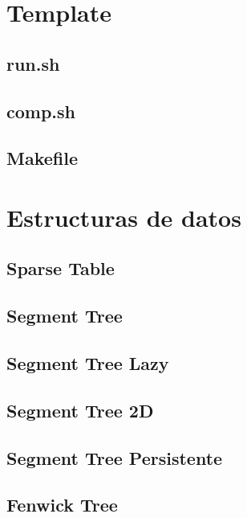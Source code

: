 \documentclass[a4paper,10pt,twocolumn]{article}
\begin{document}
{\footnotesize
\tableofcontents
}
\newpage
\section{Template} %

\subsection{run.sh}

\subsection{comp.sh}

\subsection{Makefile}


\section{Estructuras de datos} %
\subsection{Sparse Table}

\subsection{Segment Tree}

\subsection{Segment Tree Lazy}

\subsection{Segment Tree 2D}

\subsection{Segment Tree Persistente}

\subsection{Fenwick Tree}

\end{document}

